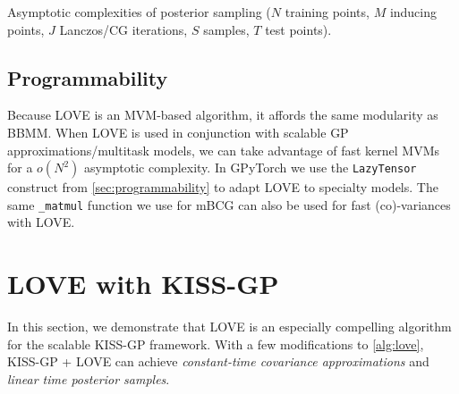 \begin{table*}[t!]
  \caption[Asymptotic complexities of posterior sampling with LOVE + KISS-GP versus other methods.]{
    Asymptotic complexities of posterior sampling
		($N$ training points, $M$ inducing points, $J$ Lanczos/CG iterations, $S$ samples, $T$ test points).
    \label{tab:running_times_sampling}
  }
  \vspace{0.5ex}
  \centering
  \resizebox{\textwidth}{!}{%
    
  }
  \vspace{-2ex}
\end{table*}


\subsection{Programmability}

Because LOVE is an MVM-based algorithm, it affords the same modularity as BBMM.
When LOVE is used in conjunction with scalable GP approximations/multitask models, we can take advantage of fast kernel MVMs for a $o(N^2)$ asymptotic complexity.
In GPyTorch we use the {\tt LazyTensor} construct from \cref{sec:programmability} to adapt LOVE to specialty models.
The same {\tt \_matmul} function we use for mBCG can also be used for fast (co)-variances with LOVE.





\section{LOVE with KISS-GP}
\label{sec:love_method_kissgp}



In this section, we demonstrate that LOVE is an especially compelling algorithm for the scalable KISS-GP framework.
With a few modifications to \cref{alg:love}, KISS-GP + LOVE can achieve \emph{constant-time covariance approximations} and \emph{linear time posterior samples}.

